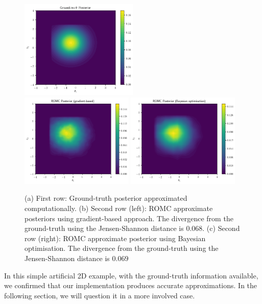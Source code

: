 \begin{figure}[ht]
  \begin{center}
      \includegraphics[width=0.5\textwidth]{./Thesis/images/chapter4/ex2D_gt_posterior.png}\\
      \includegraphics[width=0.48\textwidth]{./Thesis/images/chapter4/ex2D_romc_posterior.png}
      \includegraphics[width=0.48\textwidth]{./Thesis/images/chapter4/ex2D_romc_posterior_bo.png}
    \end{center}
    \caption[2D example, evaluation of the approximate posterior.]{(a) First row: Ground-truth posterior approximated
      computationally. (b) Second row (left): ROMC approximate
      posteriors using gradient-based approach. The divergence from
      the ground-truth using the Jensen-Shannon distance is
      $0.068$. (c) Second row (right): ROMC approximate posterior
      using Bayesian optimisation. The divergence from the
      ground-truth using the Jensen-Shannon distance is $0.069$}
  \label{fig:ex2_4}
\end{figure}

In this simple artificial 2D example, with the ground-truth
information available, we confirmed that our implementation produces
accurate approximations. In the following section, we will question it
in a more involved case.

